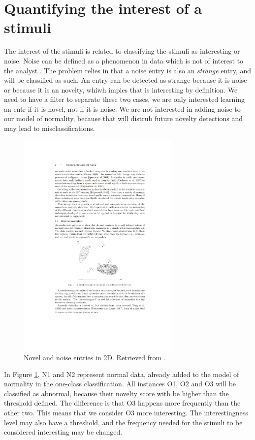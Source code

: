 \section{Quantifying the interest of a stimuli} \label{2.2}

The interest of the stimuli is related to classifying the stimuli as interesting or noise. Noise can be defined as a phenomenon in data which is not of interest to the analyst \cite{Chandola2009}. The problem relies in that a noise entry is also an \emph{strange} entry, and will be classified as such. An entry can be detected as strange because it is noise or because it is an novelty, whiwh impies that is interesting by definition. We need to have a filter to separate these two cases, we are only interested learning an entr if it is novel, not if it is noise. We are not interested in adding noise to our model of normality, because that will distrub future novelty detections and may lead to misclassifications.

\begin{figure}[h]
\includegraphics[width=8cm]{Figures/Outliers}
\centering
\caption[Novel and noise entries in 2D.]{Novel and noise entries in 2D. Retrieved from \citeauthor{Chandola2009} \cite{Chandola2009}. \label{fig:out}}
\end{figure}

In Figure \ref{fig:out}, N1 and N2 represent normal data, already added to the model of normality in the one-class classification. 
All instances O1, O2 and O3 will be classified as abnormal, because their novelty score with  be higher than the threshold defined. The difference is that O3 happens more frequently than the other two. This means that we consider O3 more interesting.
The interestingness level may also have a threshold, and the frequency needed for the stimuli to be considered interesting may be changed.


